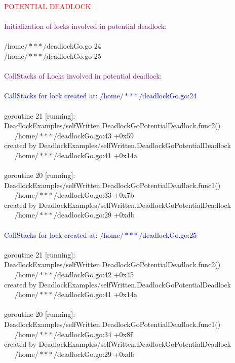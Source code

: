 \begin{mdframed}
\textcolor{red}{POTENTIAL DEADLOCK}\\
\\
\textcolor{purple}{Initialization of locks involved in potential deadlock:}\\
\\
/home$/***/$deadlockGo.go 24\\
/home$/***/$deadlockGo.go 25\\
\\
\textcolor{purple}{CallStacks of Locks involved in potential deadlock:}\\
\\
\textcolor{blue}{CallStacks for lock created at: $/$home$/***/$deadlockGo.go:24}\\
\\
goroutine 21 [running]:\\
DeadlockExamples/selfWritten.DeadlockGoPotentialDeadlock.func2()\\
        $\phantom{111}/$home$/***/$deadlockGo.go:43 +0x59\\
created by DeadlockExamples$/$selfWritten.DeadlockGoPotentialDeadlock\\
        $\phantom{111}/$home$/***/$deadlockGo.go:41 +0x14a\\
\\
goroutine 20 [running]:\\
DeadlockExamples$/$selfWritten.DeadlockGoPotentialDeadlock.func1()\\
        $\phantom{111}/$home$/***/$deadlockGo.go:33 +0x7b\\
created by DeadlockExamples$/$selfWritten.DeadlockGoPotentialDeadlock\\
        $\phantom{111}/$home$/***/$deadlockGo.go:29 +0xdb\\
\\
\textcolor{blue}{CallStacks for lock created at: $/$home$/***/$deadlockGo.go:25}\\
\\
goroutine 21 [running]:\\
DeadlockExamples$/$selfWritten.DeadlockGoPotentialDeadlock.func2()\\
        $\phantom{111}/$home$/***/$deadlockGo.go:42 +0x45\\
created by DeadlockExamples$/$selfWritten.DeadlockGoPotentialDeadlock\\
        $\phantom{111}/$home$/***/$deadlockGo.go:41 +0x14a\\
\\
goroutine 20 [running]:\\
DeadlockExamples$/$selfWritten.DeadlockGoPotentialDeadlock.func1()\\
        $\phantom{111}/$home$/***/$deadlockGo.go:34 +0x8f\\
created by DeadlockExamples/selfWritten.DeadlockGoPotentialDeadlock\\
        $\phantom{111}/$home$/***/$deadlockGo.go:29 +0xdb
\end{mdframed}

